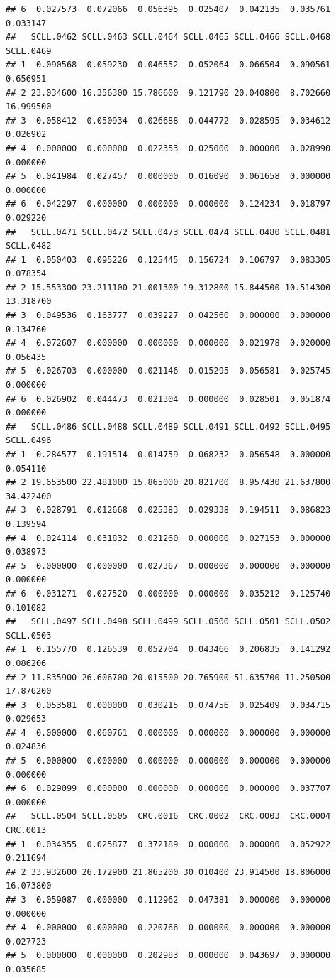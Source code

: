 \documentclass[
]{article}
\begin{document}
\begin{verbatim}
## 6  0.027573  0.072066  0.056395  0.025407  0.042135  0.035761  0.033147
##   SCLL.0462 SCLL.0463 SCLL.0464 SCLL.0465 SCLL.0466 SCLL.0468 SCLL.0469
## 1  0.090568  0.059230  0.046552  0.052064  0.066504  0.090561  0.656951
## 2 23.034600 16.356300 15.786600  9.121790 20.040800  8.702660 16.999500
## 3  0.058412  0.050934  0.026688  0.044772  0.028595  0.034612  0.026902
## 4  0.000000  0.000000  0.022353  0.025000  0.000000  0.028990  0.000000
## 5  0.041984  0.027457  0.000000  0.016090  0.061658  0.000000  0.000000
## 6  0.042297  0.000000  0.000000  0.000000  0.124234  0.018797  0.029220
##   SCLL.0471 SCLL.0472 SCLL.0473 SCLL.0474 SCLL.0480 SCLL.0481 SCLL.0482
## 1  0.050403  0.095226  0.125445  0.156724  0.106797  0.083305  0.078354
## 2 15.553300 23.211100 21.001300 19.312800 15.844500 10.514300 13.318700
## 3  0.049536  0.163777  0.039227  0.042560  0.000000  0.000000  0.134760
## 4  0.072607  0.000000  0.000000  0.000000  0.021978  0.020000  0.056435
## 5  0.026703  0.000000  0.021146  0.015295  0.056581  0.025745  0.000000
## 6  0.026902  0.044473  0.021304  0.000000  0.028501  0.051874  0.000000
##   SCLL.0486 SCLL.0488 SCLL.0489 SCLL.0491 SCLL.0492 SCLL.0495 SCLL.0496
## 1  0.284577  0.191514  0.014759  0.068232  0.056548  0.000000  0.054110
## 2 19.653500 22.481000 15.865000 20.821700  8.957430 21.637800 34.422400
## 3  0.028791  0.012668  0.025383  0.029338  0.194511  0.086823  0.139594
## 4  0.024114  0.031832  0.021260  0.000000  0.027153  0.000000  0.038973
## 5  0.000000  0.000000  0.027367  0.000000  0.000000  0.000000  0.000000
## 6  0.031271  0.027520  0.000000  0.000000  0.035212  0.125740  0.101082
##   SCLL.0497 SCLL.0498 SCLL.0499 SCLL.0500 SCLL.0501 SCLL.0502 SCLL.0503
## 1  0.155770  0.126539  0.052704  0.043466  0.206835  0.141292  0.086206
## 2 11.835900 26.606700 20.015500 20.765900 51.635700 11.250500 17.876200
## 3  0.053581  0.000000  0.030215  0.074756  0.025409  0.034715  0.029653
## 4  0.000000  0.060761  0.000000  0.000000  0.000000  0.000000  0.024836
## 5  0.000000  0.000000  0.000000  0.000000  0.000000  0.000000  0.000000
## 6  0.029099  0.000000  0.000000  0.000000  0.000000  0.037707  0.000000
##   SCLL.0504 SCLL.0505  CRC.0016  CRC.0002  CRC.0003  CRC.0004  CRC.0013
## 1  0.034355  0.025877  0.372189  0.000000  0.000000  0.052922  0.211694
## 2 33.932600 26.172900 21.865200 30.010400 23.914500 18.806000 16.073800
## 3  0.059087  0.000000  0.112962  0.047381  0.000000  0.000000  0.000000
## 4  0.000000  0.000000  0.220766  0.000000  0.000000  0.000000  0.027723
## 5  0.000000  0.000000  0.202983  0.000000  0.043697  0.000000  0.035685

\end{verbatim}
\end{document}
